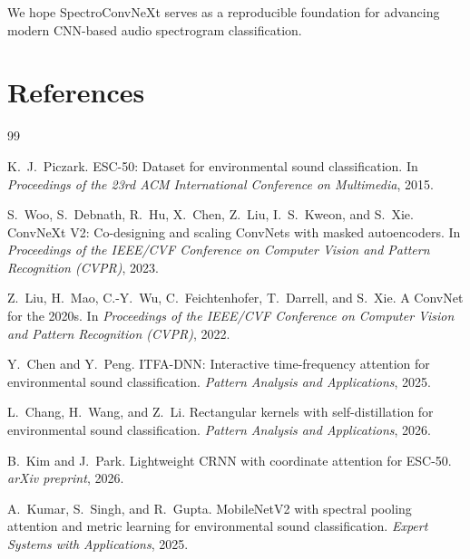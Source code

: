 \documentclass{article}
\begin{document}
We hope SpectroConvNeXt serves as a reproducible foundation for advancing
modern CNN-based audio spectrogram classification.


\section*{References}
{\small
\begin{thebibliography}{99}

K.~J.~Piczark.
ESC-50: Dataset for environmental sound classification.
In \textit{Proceedings of the 23rd ACM International Conference on Multimedia}, 2015.

S.~Woo, S.~Debnath, R.~Hu, X.~Chen, Z.~Liu, I.~S.~Kweon, and S.~Xie.
ConvNeXt V2: Co-designing and scaling ConvNets with masked autoencoders.
In \textit{Proceedings of the IEEE/CVF Conference on Computer Vision and Pattern Recognition (CVPR)}, 2023.

Z.~Liu, H.~Mao, C.-Y.~Wu, C.~Feichtenhofer, T.~Darrell, and S.~Xie.
A ConvNet for the 2020s.
In \textit{Proceedings of the IEEE/CVF Conference on Computer Vision and Pattern Recognition (CVPR)}, 2022.

Y.~Chen and Y.~Peng.
ITFA-DNN: Interactive time-frequency attention for environmental sound classification.
\emph{Pattern Analysis and Applications}, 2025.

L.~Chang, H.~Wang, and Z.~Li.
Rectangular kernels with self-distillation for environmental sound classification.
\emph{Pattern Analysis and Applications}, 2026.

B.~Kim and J.~Park.
Lightweight CRNN with coordinate attention for ESC-50.
\emph{arXiv preprint}, 2026.

A.~Kumar, S.~Singh, and R.~Gupta.
MobileNetV2 with spectral pooling attention and metric learning for environmental sound classification.
\emph{Expert Systems with Applications}, 2025.


\end{thebibliography}}
\end{document}
